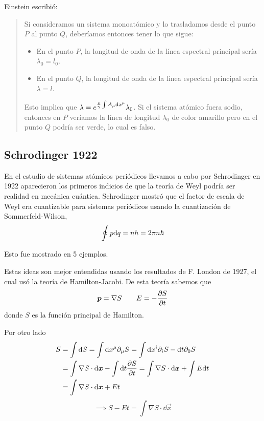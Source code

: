 Einstein escribió:
\begin{quote}
	Si consideramos un sistema monoatómico y lo trasladamos desde el punto $P$ al punto $Q$, deberíamos entonces tener lo que sigue:
	\begin{itemize}
		\item En el punto $P$, la longitud de onda de la línea espectral principal sería $\lambda_0=l_0$.
		\item En el punto $Q$, la longitud de onda de la línea espectral principal sería $\lambda=l$.
	\end{itemize}
	Esto implica que $\lambda=e^{\frac{e}{\gamma }\int A_\mu\dd x^\mu }\lambda_0$. Si el sistema atómico fuera sodio, entonces en $P$ veríamos la línea de longitud $\lambda_0$ de color amarillo pero en el punto $Q$ podría ser verde, lo cual es falso.
\end{quote}

\subsection{Schrodinger 1922}
En el estudio de sistemas atómicos periódicos llevamos a cabo por Schrodinger en 1922 aparecieron los primeros indicios de que la teoría de Weyl podría ser realidad en mecánica cuántica. Schrodinger mostró que el factor de escala de Weyl era cuantizable para sistemas periódicos usando la cuantización de Sommerfeld-Wilson,
\begin{equation}
  \oint p\dd q=n h=2\pi n\hbar
\end{equation}

Esto fue mostrado en 5 ejemplos.

Estas ideas son mejor entendidas usando los resultados de F. London de 1927, el cual usó la teoría de Hamilton-Jacobi. De esta teoría sabemos que 
\begin{equation}
  \vb*{p}=\nabla S\qquad E=-\pdv{S}{t}
\end{equation}
donde $S$ es la función principal de Hamilton.

Por otro lado
\begin{align}
  S&=\int \dd S=\int \dd x^\mu \partial_\mu S=\int\dd x^{i}\partial_i S-\dd t\partial_0 S\\
  &=\int\nabla S\cdot \dd\vb*{x}-\int\dd t\pdv{S}{t}=\int\nabla S\cdot\dd\vb*{x}+\int E\dd t\\
  &=\int\nabla S\cdot\dd\vb*{x}+Et
\end{align}
\begin{equation}
  \implies \boxed{S-Et=\int\nabla S\cdot\dd\vec{x}}
\end{equation}

